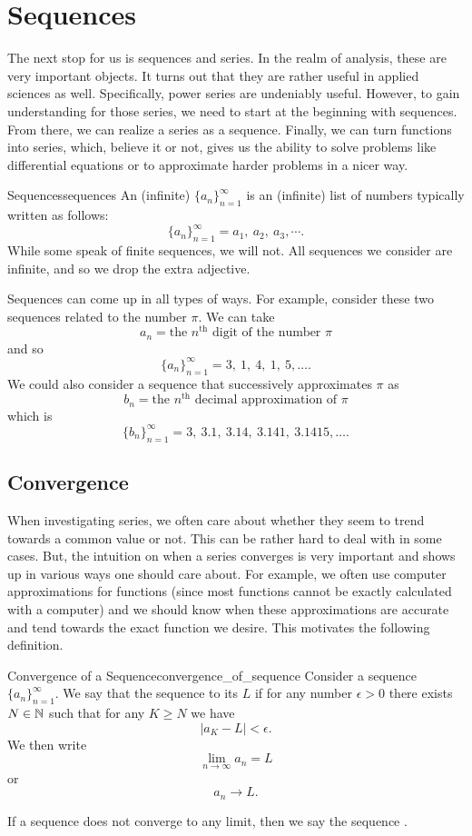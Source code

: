 \section{Sequences}
The next stop for us is sequences and series.  In the realm of analysis, these are very important objects.  It turns out that they are rather useful in applied sciences as well.  Specifically, power series are undeniably useful.  However, to gain understanding for those series, we need to start at the beginning with sequences.  From there, we can realize a series as a sequence.  Finally, we can turn functions into series, which, believe it or not, gives us the ability to solve problems like differential equations or to approximate harder problems in a nicer way.

\begin{df}{Sequences}{sequences}
An (infinite)  $\{a_n\}_{n=1}^\infty$ is an (infinite) list of numbers typically written as follows:
\[
\{a_n\}_{n=1}^\infty = a_1,~ a_2,~ a_3, \cdots.
\]
While some speak of finite sequences, we will not.  All sequences we consider are infinite, and so we drop the extra adjective.
\end{df}

Sequences can come up in all types of ways.  For example, consider these two sequences related to the number $\pi$.  We can take
\[
a_n = \textrm{the $n^\textrm{th}$ digit of the number $\pi$}
\]
and so
\[
\{a_n\}_{n=1}^\infty = 3,~1,~4,~1,~5, \dots.
\]
We could also consider a sequence that successively approximates $\pi$ as
\[
b_n = \textrm{the $n^\textrm{th}$ decimal approximation of $\pi$}
\]
which is
\[
\{b_n\}_{n=1}^\infty = 3,~3.1, ~ 3.14, ~ 3.141, ~ 3.1415, \dots.
\]

\subsection{Convergence}
When investigating series, we often care about whether they seem to trend towards a common value or not.  This can be rather hard to deal with in some cases.  But, the intuition on when a series converges is very important and shows up in various ways one should care about.  For example, we often use computer approximations for functions (since most functions cannot be exactly calculated with a computer) and we should know when these approximations are accurate and tend towards the exact function we desire.  This motivates the following definition.

\begin{df}{Convergence of a Sequence}{convergence_of_sequence}
Consider a sequence $\{a_n\}_{n=1}^\infty$.  We say that the sequence  to its  $L$ if for any number $\epsilon>0$ there exists $N\in \mathbb{N}$ such that for any $K\geq N$ we have
\[
|a_{K}-L|<\epsilon.
\]
We then write
\[
\lim_{n\to \infty} a_n = L
\]
or
\[
a_n \to L.
\]

If a sequence does not converge to any limit, then we say the sequence .
\end{df}

